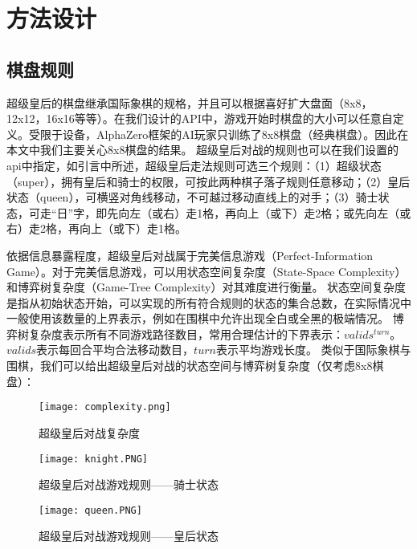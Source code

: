 \chapter{方法设计}
\label{chap:algorithm}

\section{棋盘规则}
超级皇后的棋盘继承国际象棋的规格，并且可以根据喜好扩大盘面（8x8，12x12，16x16等等）。在我们设计的API中，游戏开始时棋盘的大小可以任意自定义。受限于设备，AlphaZero框架的AI玩家只训练了8x8棋盘（经典棋盘）。因此在本文中我们主要关心8x8棋盘的结果。
超级皇后对战的规则也可以在我们设置的api中指定，如引言中所述，超级皇后走法规则可选三个规则：（1）超级状态（super），拥有皇后和骑士的权限，可按此两种棋子落子规则任意移动；（2）皇后状态（queen），可横竖对角线移动，不可越过移动直线上的对手；（3）骑士状态，可走“日”字，即先向左（或右）走1格，再向上（或下）走2格；或先向左（或右）走2格，再向上（或下）走1格。

依据信息暴露程度，超级皇后对战属于完美信息游戏（Perfect-Information Game）\cite{binmore2007game}。对于完美信息游戏，可以用状态空间复杂度（State-Space Complexity）和博弈树复杂度（Game-Tree Complexity）对其难度进行衡量\cite{allis1994searching,VANDENHERIK2002277}。
状态空间复杂度是指从初始状态开始，可以实现的所有符合规则的状态的集合总数，在实际情况中一般使用该数量的上界表示，例如在围棋中允许出现全白或全黑的极端情况。
博弈树复杂度表示所有不同游戏路径数目，常用合理估计的下界表示：$valids^{turn}$。 $valids$表示每回合平均合法移动数目，$turn$表示平均游戏长度。
类似于国际象棋与围棋，我们可以给出超级皇后对战的状态空间与博弈树复杂度（仅考虑8x8棋盘）：
\begin{figure}[htb]
    \centering
    \texttt{[image: complexity.png]}
    \caption[complexity]{%
        超级皇后对战复杂度\cite{enwiki:complexity}%
      }
    \label{fig:complexity}
\end{figure}

\begin{figure}[htb]
    \centering
    \texttt{[image: knight.PNG]}
    \caption[rules_knight]{%
        超级皇后对战游戏规则——骑士状态%
      }
    \label{fig:knight}
\end{figure}

\begin{figure}[htb]
    \centering
    \texttt{[image: queen.PNG]}
    \caption[rules_queen]{%
        超级皇后对战游戏规则——皇后状态%
      }
    \label{fig:queen}
\end{figure}

